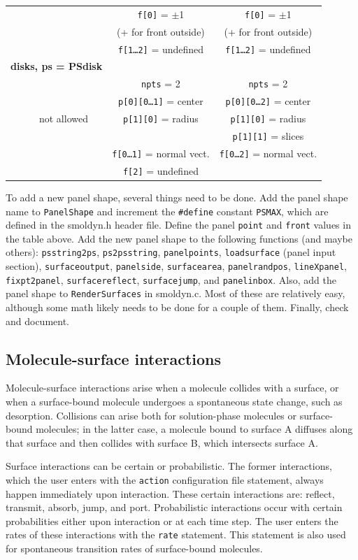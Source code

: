 \documentclass {scrbook}
\newcommand {\ttt} {\texttt}
\begin{document}
\begin{longtable}[c]{lccc}
&&\ttt{f[0]} = $\pm$1&\ttt{f[0]} = $\pm$1\\ 
&&(+ for front outside)&(+ for front outside)\\ 
&&\ttt{f[1\ldots2]} = undefined&\ttt{f[1\ldots2]} = undefined\\
\hline
\multicolumn{2}{l}{\textbf{disks, ps = PSdisk}}\\
&&\ttt{npts} = 2&\ttt{npts} = 2\\ 
&&\ttt{p[0][0\ldots1]} = center&\ttt{p[0][0\ldots2]} = center\\ 
&not allowed&\ttt{p[1][0]} = radius&\ttt{p[1][0]} = radius\\ 
&&&\ttt{p[1][1]} = slices\\ 
&&\ttt{f[0\ldots1]} = normal vect.&\ttt{f[0\ldots2]} = normal vect.\\ 
&&\ttt{f[2]} = undefined&\\

\end{longtable}

To add a new panel shape, several things need to be done. Add the panel shape name to \ttt{PanelShape} and increment the \ttt{\#define} constant \ttt{PSMAX}, which are defined in the smoldyn.h header file. Define the panel \ttt{point} and \ttt{front} values in the table above. Add the new panel shape to the following functions (and maybe others): \ttt{psstring2ps}, \ttt{ps2psstring}, \ttt{panelpoints}, \ttt{loadsurface} (panel input section), \ttt{surfaceoutput}, \ttt{panelside}, \ttt{surfacearea}, \ttt{panelrandpos}, \ttt{lineXpanel}, \ttt{fixpt2panel}, \ttt{surfacereflect}, \ttt{surfacejump}, and \ttt{panelinbox}. Also, add the panel shape to \ttt{RenderSurfaces} in smoldyn.c. Most of these are relatively easy, although some math likely needs to be done for a couple of them. Finally, check and document.

\subsection{Molecule-surface interactions}

Molecule-surface interactions arise when a molecule collides with a surface, or when a surface-bound molecule undergoes a spontaneous state change, such as desorption. Collisions can arise both for solution-phase molecules or surface-bound molecules; in the latter case, a molecule bound to surface A diffuses along that surface and then collides with surface B, which intersects surface A.

Surface interactions can be certain or probabilistic. The former interactions, which the user enters with the \ttt{action} configuration file statement, always happen immediately upon interaction. These certain interactions are: reflect, transmit, absorb, jump, and port. Probabilistic interactions occur with certain probabilities either upon interaction or at each time step. The user enters the rates of these interactions with the \ttt{rate} statement. This statement is also used for spontaneous transition rates of surface-bound molecules.
\end{document}
